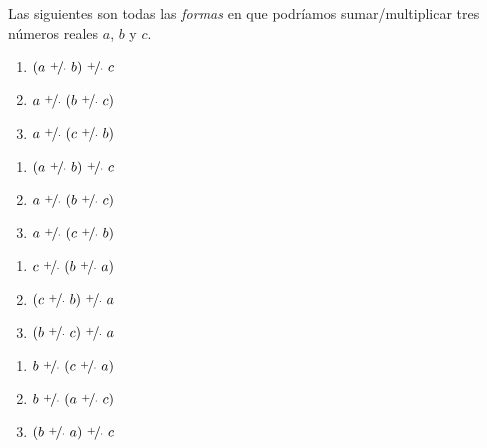 \documentclass[11pt]{article}
\begin{document}
Las siguientes son todas las \textit{formas} en que podríamos sumar/multiplicar tres números reales $a$, $b$ y $c$.
\begin{center}
    \begin{minipage}[c]{.2\linewidth}
        \begin{enumerate}[label=\roman*.]
            \item $(a \ \nicefrac{+}{\cdot} \ b) \ \nicefrac{+}{\cdot} \ c$
            \item $a \ \nicefrac{+}{\cdot} \ (b \ \nicefrac{+}{\cdot} \ c)$
            \item $a \ \nicefrac{+}{\cdot} \ (c \ \nicefrac{+}{\cdot} \ b)$
        \end{enumerate}
        \end{minipage}%
        \begin{minipage}[c]{.2\linewidth}
            \begin{enumerate}[start=4,label=\roman*.]
                \item $(a \ \nicefrac{+}{\cdot} \ b) \ \nicefrac{+}{\cdot} \ c$
                \item $a \ \nicefrac{+}{\cdot} \ (b \ \nicefrac{+}{\cdot} \ c)$
                \item $a \ \nicefrac{+}{\cdot} \ (c \ \nicefrac{+}{\cdot} \ b)$
            \end{enumerate}
            \end{minipage}%
        \begin{minipage}[c]{.2\linewidth}
            \begin{enumerate}[start=7,label=\roman*.]
            \item $c \ \nicefrac{+}{\cdot} \ (b \ \nicefrac{+}{\cdot} \ a)$
            \item $(c \ \nicefrac{+}{\cdot} \ b) \ \nicefrac{+}{\cdot} \ a$
            \item $(b \ \nicefrac{+}{\cdot} \ c) \ \nicefrac{+}{\cdot} \ a$
        \end{enumerate}
        \end{minipage}
        \begin{minipage}[c]{.2\linewidth}
            \begin{enumerate}[start=10,label=\roman*.]
            \item $b \ \nicefrac{+}{\cdot} \ (c \ \nicefrac{+}{\cdot} \ a)$
            \item $b \ \nicefrac{+}{\cdot} \ (a \ \nicefrac{+}{\cdot} \ c)$
            \item $(b \ \nicefrac{+}{\cdot} \ a) \ \nicefrac{+}{\cdot} \ c$
        \end{enumerate}
        \end{minipage}
\end{center}
\end{document}
